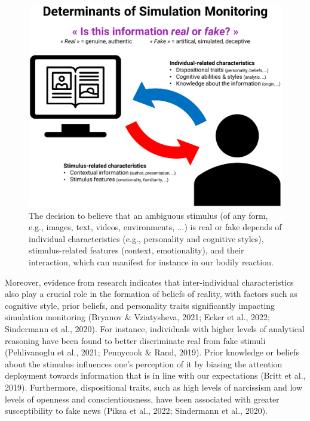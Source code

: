 \documentclass[
  man,floatsintext]{apa6}
\begin{document}
\begin{figure}
\includegraphics[width=1\linewidth]{../figures/Figure1} \caption{The decision to believe that an ambiguous stimulus (of any form, e.g., images, text, videos, environments, ...) is real or fake depends of individual characteristics (e.g., personality and cognitive styles), stimulus-related features (context, emotionality), and their interaction, which can manifest for instance in our bodily reaction.}\label{fig:unnamed-chunk-2}
\end{figure}

Moreover, evidence from research indicates that inter-individual characteristics also play a crucial role in the formation of beliefs of reality, with factors such as cognitive style, prior beliefs, and personality traits significantly impacting simulation monitoring (Bryanov \& Vziatysheva, 2021; Ecker et al., 2022; Sindermann et al., 2020). For instance, individuals with higher levels of analytical reasoning have been found to better discriminate real from fake stimuli (Pehlivanoglu et al., 2021; Pennycook \& Rand, 2019). Prior knowledge or beliefs about the stimulus influences one's perception of it by biasing the attention deployment towards information that is in line with our expectations (Britt et al., 2019). Furthermore, dispositional traits, such as high levels of narcissism and low levels of openness and conscientiousness, have been associated with greater susceptibility to fake news (Piksa et al., 2022; Sindermann et al., 2020).
\end{document}

